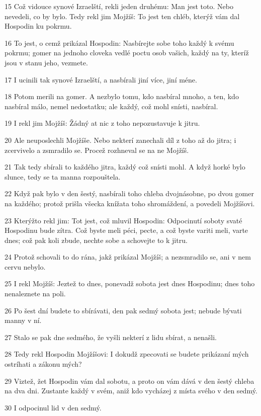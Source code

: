 \par 15 Což vidouce synové Izraelští, rekli jeden druhému: Man jest toto. Nebo nevedeli, co by bylo. Tedy rekl jim Mojžíš: To jest ten chléb, kterýž vám dal Hospodin ku pokrmu.
\par 16 To jest, o cemž prikázal Hospodin: Nasbírejte sobe toho každý k svému pokrmu; gomer na jednoho cloveka vedlé poctu osob vašich, každý na ty, kteríž jsou v stanu jeho, vezmete.
\par 17 I ucinili tak synové Izraelští, a nasbírali jiní více, jiní méne.
\par 18 Potom merili na gomer. A nezbylo tomu, kdo nasbíral mnoho, a ten, kdo nasbíral málo, nemel nedostatku; ale každý, což mohl snísti, nasbíral.
\par 19 I rekl jim Mojžíš: Žádný at nic z toho nepozustavuje k jitru.
\par 20 Ale neuposlechli Mojžíše. Nebo nekterí zanechali díl z toho až do jitra; i zcervivelo a zsmradilo se. Procež rozhneval se na ne Mojžíš.
\par 21 Tak tedy sbírali to každého jitra, každý což snísti mohl. A když horké bylo slunce, tedy se ta manna rozpouštela.
\par 22 Když pak bylo v den šestý, nasbírali toho chleba dvojnásobne, po dvou gomer na každého; protož prišla všecka knížata toho shromáždení, a povedeli Mojžíšovi.
\par 23 Kterýžto rekl jim: Tot jest, což mluvil Hospodin: Odpocinutí soboty svaté Hospodinu bude zítra. Což byste meli péci, pecte, a což byste variti meli, varte dnes; což pak koli zbude, nechte sobe a schovejte to k jitru.
\par 24 Protož schovali to do rána, jakž prikázal Mojžíš; a nezsmradilo se, ani v nem cervu nebylo.
\par 25 I rekl Mojžíš: Jeztež to dnes, ponevadž sobota jest dnes Hospodinu; dnes toho nenaleznete na poli.
\par 26 Po šest dní budete to sbírávati, den pak sedmý sobota jest; nebude bývati manny v ní.
\par 27 Stalo se pak dne sedmého, že vyšli nekterí z lidu sbírat, a nenašli.
\par 28 Tedy rekl Hospodin Mojžíšovi: I dokudž zpecovati se budete prikázaní mých ostríhati a zákonu mých?
\par 29 Viztež, žet Hospodin vám dal sobotu, a proto on vám dává v den šestý chleba na dva dni. Zustante každý v svém, aniž kdo vycházej z místa svého v den sedmý.
\par 30 I odpocinul lid v den sedmý.
